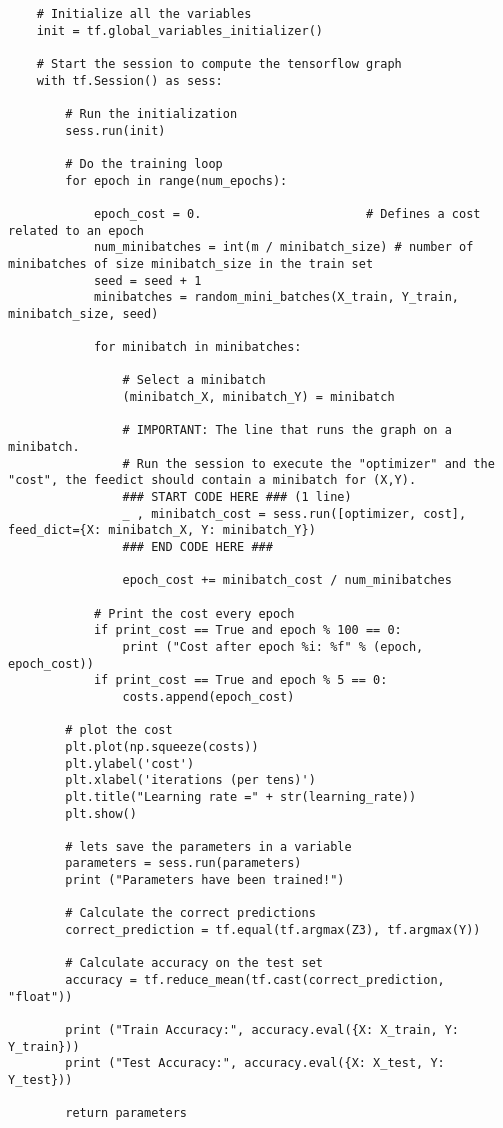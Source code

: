 \begin{verbatim}
    # Initialize all the variables
    init = tf.global_variables_initializer()

    # Start the session to compute the tensorflow graph
    with tf.Session() as sess:
        
        # Run the initialization
        sess.run(init)
        
        # Do the training loop
        for epoch in range(num_epochs):

            epoch_cost = 0.                       # Defines a cost related to an epoch
            num_minibatches = int(m / minibatch_size) # number of minibatches of size minibatch_size in the train set
            seed = seed + 1
            minibatches = random_mini_batches(X_train, Y_train, minibatch_size, seed)

            for minibatch in minibatches:

                # Select a minibatch
                (minibatch_X, minibatch_Y) = minibatch
                
                # IMPORTANT: The line that runs the graph on a minibatch.
                # Run the session to execute the "optimizer" and the "cost", the feedict should contain a minibatch for (X,Y).
                ### START CODE HERE ### (1 line)
                _ , minibatch_cost = sess.run([optimizer, cost], feed_dict={X: minibatch_X, Y: minibatch_Y})
                ### END CODE HERE ###
                
                epoch_cost += minibatch_cost / num_minibatches

            # Print the cost every epoch
            if print_cost == True and epoch % 100 == 0:
                print ("Cost after epoch %i: %f" % (epoch, epoch_cost))
            if print_cost == True and epoch % 5 == 0:
                costs.append(epoch_cost)
                
        # plot the cost
        plt.plot(np.squeeze(costs))
        plt.ylabel('cost')
        plt.xlabel('iterations (per tens)')
        plt.title("Learning rate =" + str(learning_rate))
        plt.show()

        # lets save the parameters in a variable
        parameters = sess.run(parameters)
        print ("Parameters have been trained!")

        # Calculate the correct predictions
        correct_prediction = tf.equal(tf.argmax(Z3), tf.argmax(Y))

        # Calculate accuracy on the test set
        accuracy = tf.reduce_mean(tf.cast(correct_prediction, "float"))

        print ("Train Accuracy:", accuracy.eval({X: X_train, Y: Y_train}))
        print ("Test Accuracy:", accuracy.eval({X: X_test, Y: Y_test}))
        
        return parameters
\end{verbatim}

